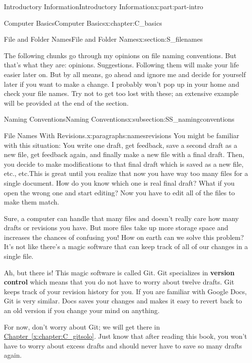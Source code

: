 \documentclass[oneside,10pt,]{book}
\newcommand{\xreffont}{\relax}
\newcommand{\terminology}[1]{\textbf{#1}}
\begin{document}
\begin{partptx}{Introductory Information}{}{Introductory Information}{}{}{x:part:part-intro}
\begin{chapterptx}{Computer Basics}{}{Computer Basics}{}{}{x:chapter:C_basics}
\begin{sectionptx}{File and Folder Names}{}{File and Folder Names}{}{}{x:section:S_filenames}
\begin{introduction}{}
\par
The following chunks go through my opinions on file naming conventions. But that's what they are: opinions. Suggestions. Following them will make your life easier later on. But by all means, go ahead and ignore me and decide for yourself later if you want to make a change. I probably won't pop up in your home and check your file names. Try not to get too lost with these; an extensive example will be provided at the end of the section.%
\end{introduction}%
%
%
\typeout{************************************************}
\typeout{************************************************}
%
\begin{subsectionptx}{Naming Conventions}{}{Naming Conventions}{}{}{x:subsection:SS_namingconventions}
\begin{paragraphs}{File Names With Revisions.}{x:paragraphs:namesrevisions}%
%
%
You might be familiar with this situation: You write one draft, get feedback, save a second draft as a new file, get feedback again, and finally make a new file with a final draft. Then, you decide to make modifications to that final draft which is saved as a new file, etc., etc.This is great until you realize that now you have way too many files for a single document. How do you know which one is real final draft? What if you open the wrong one and start editing? Now you have to edit all of the files to make them match.%
\par
Sure, a computer can handle that many files and doesn't really care how many drafts or revisions you have. But more files take up more storage space and increases the chances of confusing you! How on earth can we solve this problem? It's not like there's a magic software that can keep track of all of our changes in a single file.%
\par
Ah, but there is! This magic software is called Git. Git specializes in \terminology{version control} which means that you do not have to worry about twelve drafts. Git keeps track of your revision history for you. If you are familiar with Google Docs, Git is very similar. Docs saves your changes and makes it easy to revert back to an old version if you change your mind on anything.%
\par
For now, don't worry about Git; we will get there in \hyperref[x:chapter:C_gitsolo]{Chapter~{\xreffont\ref{x:chapter:C_gitsolo}}}. Just know that after reading this book, you won't have to worry about excess drafts and should never have to save so many drafts again.%

\end{paragraphs}
\end{subsectionptx}
\end{sectionptx}
\end{chapterptx}
\end{partptx}
\end{document}
